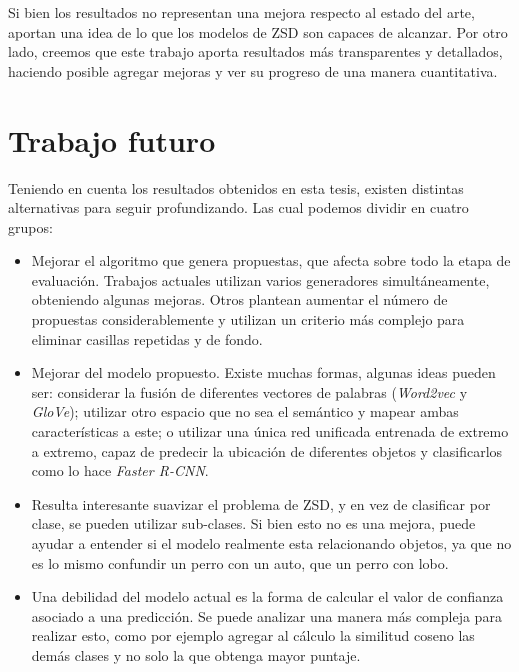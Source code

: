 Si bien los resultados no representan una mejora respecto al estado del arte, aportan una idea de lo que los modelos de ZSD son capaces de alcanzar. Por otro lado, creemos que este trabajo aporta resultados más transparentes y detallados, haciendo posible agregar mejoras y ver su progreso de una manera cuantitativa.


\section{Trabajo futuro} \label{sec:trabajo futuro}

Teniendo en cuenta los resultados obtenidos en esta tesis, existen distintas alternativas para seguir profundizando. Las cual podemos dividir en cuatro grupos:

\begin{itemize}
	\item Mejorar el algoritmo que genera propuestas, que afecta sobre todo la etapa de evaluación. Trabajos actuales utilizan varios generadores simultáneamente, obteniendo algunas mejoras. Otros plantean aumentar el número de propuestas considerablemente y utilizan un criterio más complejo para eliminar casillas repetidas y de fondo.
	\item Mejorar del modelo propuesto. Existe muchas formas, algunas ideas pueden ser: considerar la fusión de diferentes vectores de palabras (\textit{Word2vec} y \textit{GloVe}); utilizar otro espacio que no sea el semántico y mapear ambas características a este; o utilizar una única red unificada entrenada de extremo a extremo, capaz de predecir la ubicación de diferentes objetos y clasificarlos como lo hace \textit{Faster R-CNN}.
	\item Resulta interesante suavizar el problema de ZSD, y en vez de clasificar por clase, se pueden utilizar sub-clases. Si bien esto no es una mejora, puede ayudar a entender si el modelo realmente esta relacionando objetos, ya que no es lo mismo confundir un perro con un auto, que un perro con lobo.
	\item Una debilidad del modelo actual es la forma de calcular el valor de confianza asociado a una predicción. Se puede analizar una manera más compleja para realizar esto, como por ejemplo agregar al cálculo la similitud coseno las demás clases y no solo la que obtenga mayor puntaje.
\end{itemize}

